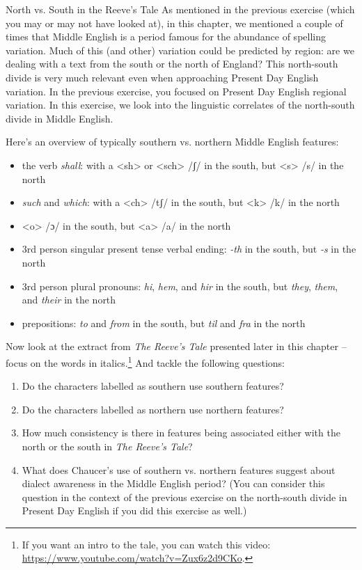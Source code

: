 \begin{exercises}{North vs. South in the Reeve's Tale}\label{ex-Reeve}
As mentioned in the previous exercise (which you may or may not have looked at), in this chapter, we mentioned a couple of times that Middle English is a period famous for the abundance of spelling variation. Much of this (and other) variation could be predicted by region: are we dealing with a text from the south or the north of England? This north-south divide is very much relevant even when approaching Present Day English variation. In the previous exercise, you focused on Present Day English regional variation. In this exercise, we look into the linguistic correlates of the north-south divide in Middle English.

Here's an overview of typically southern vs. northern Middle English features:
\begin{itemize}
\item the verb \textit{shall}: with a <sh> or <sch> /ʃ/ in the south, but <s> /s/ in the north
\item \textit{such} and \textit{which}: with a <ch> /tʃ/ in the south, but <k> /k/ in the north 
\item <o> /ɔ/ in the south, but <a> /a/ in the north
\item 3rd person singular present tense verbal ending: \textit{-th} in the south, but \textit{-s} in the north
\item 3rd person plural pronouns: \textit{hi}, \textit{hem}, and \textit{hir} in the south, but \textit{they}, \textit{them}, and \textit{their} in the north
\item prepositions: \textit{to} and \textit{from} in the south, but \textit{til} and \textit{fra} in the north
\end{itemize}

\noindent Now look at the extract from \textit{The Reeve's Tale} presented later in this chapter -- focus on the words in italics.\footnote{If you want an intro to the tale, you can watch this video: \url{https://www.youtube.com/watch?v=Zux6z2d9CKo}.} And tackle the following questions:
\begin{enumerate}
\item Do the characters labelled as southern use southern features?
\item Do the characters labelled as northern use northern features?
\item How much consistency is there in features being associated either with the north or the south in \textit{The Reeve's Tale}?
\item What does Chaucer's use of southern vs. northern features suggest about dialect awareness in the Middle English period? (You can consider this question in the context of the previous exercise on the north-south divide in Present Day English if you did this exercise as well.)
\end{enumerate}


\end{exercises}
